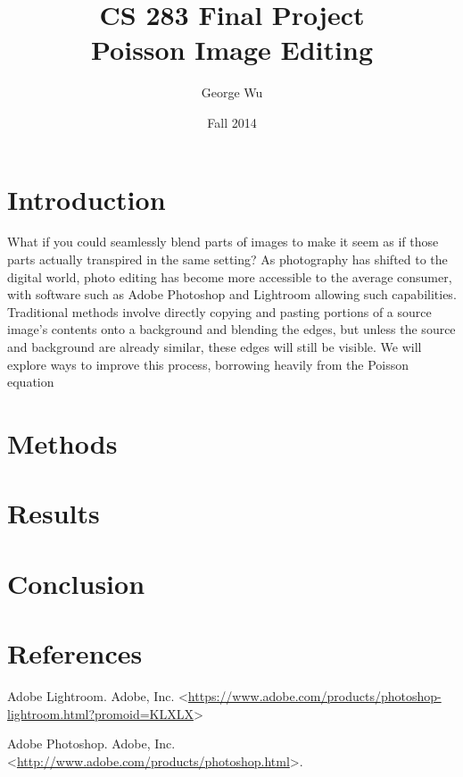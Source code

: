 \documentclass[12pt]{article}
\begin{document}
\title{CS 283 Final Project \\ Poisson Image Editing}
\date{Fall 2014}
\author{George Wu}

\maketitle

\section{Introduction}
What if you could seamlessly blend parts of images to make it seem as if those parts actually transpired in the same setting? As photography has shifted to the digital world, photo editing has become more accessible to the average consumer, with software such as Adobe Photoshop \cite{photoshop} and Lightroom \cite{lightroom} allowing such capabilities. Traditional methods involve directly copying and pasting portions of a source image's contents onto a background and blending the edges, but unless the source and background are already similar, these edges will still be visible. We will explore ways to improve this process, borrowing heavily from the Poisson equation

\section{Methods}

\section{Results} 

\section{Conclusion}

\section{References}
\begin{thebibliography}{99}

Adobe Lightroom. Adobe, Inc. \textless\url{https://www.adobe.com/products/photoshop-lightroom.html?promoid=KLXLX}\textgreater

Adobe Photoshop. Adobe, Inc. \textless\url{http://www.adobe.com/products/photoshop.html}\textgreater.
\end{thebibliography}
\end{document}
